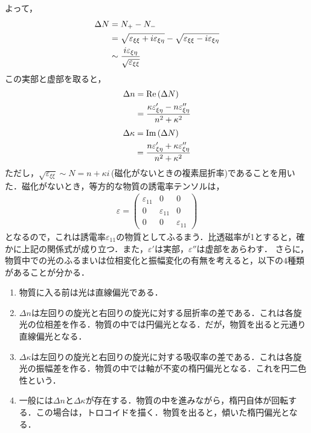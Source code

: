 よって，
\begin{align}
  \Delta{N} &= N_+ - N_ - \notag \\
  &= \sqrt{\varepsilon_{\xi\xi}+i\varepsilon_{\xi\eta}} - \sqrt{\varepsilon_{\xi\xi} - i\varepsilon_{\xi\eta}}\notag \\
  &\sim\dfrac{i\varepsilon_{\xi\eta}}{\sqrt{\varepsilon_{\xi\xi}}}
\end{align}
この実部と虚部を取ると，
\begin{align}
  \Delta{n} &= \text{Re}\,(\Delta{N})\notag \\
  &= \dfrac{\kappa\varepsilon'_{\xi\eta} - n\varepsilon''_{\xi\eta}}{n^2+\kappa^2} \label{faraday_eff_deltan}
\end{align}
\begin{align}
  \Delta{\kappa} &= \text{Im}\,(\Delta{N})\notag \\
  &= \dfrac{n\varepsilon'_{\xi\eta}+\kappa\varepsilon''_{\xi\eta}}{n^2+\kappa^2} \label{faraday_eff_deltakappa}
\end{align}
ただし，$\sqrt{\varepsilon_{\xi\xi}}\sim N=n+\kappa i\,$(磁化がないときの複素屈折率)であることを用いた．磁化がないとき，等方的な物質の誘電率テンソルは，
\begin{align}
  \varepsilon=
  \left(
  \begin{array}{ccc}
    \varepsilon_{11} & 0 & 0 \\
    0 & \varepsilon_{11} & 0 \\
    0 & 0 & \varepsilon_{11}
  \end{array}
  \right)
\end{align}
となるので，これは誘電率$\varepsilon_{11}$の物質としてふるまう．比透磁率が1とすると，確かに上記の関係式が成り立つ．また，$\varepsilon'$は実部，$\varepsilon''$は虚部をあらわす．
さらに，物質中での光のふるまいは位相変化と振幅変化の有無を考えると，以下の$4$種類があることが分かる．
\begin{enumerate}
  \item 物質に入る前は光は直線偏光である．
  \item $\Delta{n}$は左回りの旋光と右回りの旋光に対する屈折率の差である．これは各旋光の位相差を作る．物質の中では円偏光となる．だが，物質を出ると元通り直線偏光となる．
  \item $\Delta{\kappa}$は左回りの旋光と右回りの旋光に対する吸収率の差である．これは各旋光の振幅差を作る．物質の中では軸が不変の楕円偏光となる．これを円二色性という．
  \item 一般には$\Delta{n}$と$\Delta{\kappa}$が存在する．物質の中を進みながら，楕円自体が回転する．この場合は，トロコイドを描く．物質を出ると，傾いた楕円偏光となる．
\end{enumerate}

